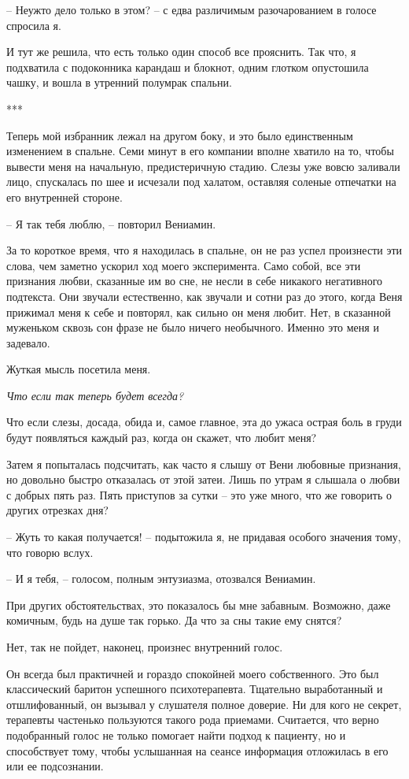 \documentclass[
]{book}
\begin{document}
-- Неужто дело только в этом? -- с едва различимым разочарованием в голосе спросила я.

И тут же решила, что есть только один способ все прояснить. Так что, я подхватила с подоконника карандаш и блокнот, одним глотком опустошила чашку, и вошла в утренний полумрак спальни.

***

Теперь мой избранник лежал на другом боку, и это было единственным изменением в спальне. Семи минут в его компании вполне хватило на то, чтобы вывести меня на начальную, предистеричную стадию. Слезы уже вовсю заливали лицо, спускалась по шее и исчезали под халатом, оставляя соленые отпечатки на его внутренней стороне.

-- Я так тебя люблю, -- повторил Вениамин.

За то короткое время, что я находилась в спальне, он не раз успел произнести эти слова, чем заметно ускорил ход моего эксперимента. Само собой, все эти признания любви, сказанные им во сне, не несли в себе никакого негативного подтекста. Они звучали естественно, как звучали и сотни раз до этого, когда Веня прижимал меня к себе и повторял, как сильно он меня любит. Нет, в сказанной муженьком сквозь сон фразе не было ничего необычного. Именно это меня и задевало.

Жуткая мысль посетила меня.

\emph{Что если так теперь будет всегда?}

Что если слезы, досада, обида и, самое главное, эта до ужаса острая боль в груди будут появляться каждый раз, когда он скажет, что любит меня?

Затем я попыталась подсчитать, как часто я слышу от Вени любовные признания, но довольно быстро отказалась от этой затеи. Лишь по утрам я слышала о любви с добрых пять раз. Пять приступов за сутки -- это уже много, что же говорить о других отрезках дня?

-- Жуть то какая получается! -- подытожила я, не придавая особого значения тому, что говорю вслух.

-- И я тебя, -- голосом, полным энтузиазма, отозвался Вениамин.

При других обстоятельствах, это показалось бы мне забавным. Возможно, даже комичным, будь на душе так горько. Да что за сны такие ему снятся?

Нет, так не пойдет, наконец, произнес внутренний голос.

Он всегда был практичней и гораздо спокойней моего собственного. Это был классический баритон успешного психотерапевта. Тщательно выработанный и отшлифованный, он вызывал у слушателя полное доверие. Ни для кого не секрет, терапевты частенько пользуются такого рода приемами. Считается, что верно подобранный голос не только помогает найти подход к пациенту, но и способствует тому, чтобы услышанная на сеансе информация отложилась в его или ее подсознании.
\end{document}
